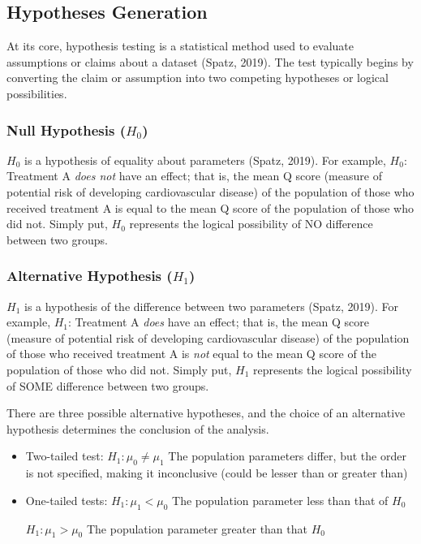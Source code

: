 \documentclass{article}
\begin{document}
 
\subsection{Hypotheses Generation}
At its core, hypothesis testing is a statistical method used to evaluate assumptions or claims about a dataset (Spatz, 2019). The test typically begins by converting the claim or assumption into two competing hypotheses or logical possibilities.  

\subsubsection{Null Hypothesis ($H_0$)}

$H_0$ is a hypothesis of equality about parameters (Spatz, 2019). For example, $H_0$: Treatment A \textit{does not} have an effect; that is, the mean Q score (measure of potential risk of developing cardiovascular disease) of the population of those who received treatment A is equal to the mean Q score of the population of those who did not. Simply put, $H_0$ represents the logical possibility of NO difference between two groups.

\subsubsection{Alternative Hypothesis ($H_1$)}
$H_1$ is a hypothesis of the difference between two parameters (Spatz, 2019). For example, $H_1$: Treatment A \textit{does} have an effect; that is, the mean Q score (measure of potential risk of developing cardiovascular disease) of the population of those who received treatment A is \textit{not} equal to the mean Q score of the population of those who did not. Simply put, $H_1$ represents the logical possibility of SOME difference between two groups.

There are three possible alternative hypotheses, and the choice of an alternative hypothesis determines the conclusion of the analysis. 

\begin{itemize}

    \item Two-tailed test: 
    \begin{math}H_1: \mu_0 \neq \mu_1\end{math} The population parameters differ, but the order is not specified, making it inconclusive (could be lesser than or greater than)
    
    \item One-tailed tests:
        \subitem \begin{math}H_1 : \mu_1 < \mu_0\end{math} The population parameter less than that of $H_0$

        \subitem \begin{math}H_1 : \mu_1 > \mu_0\end{math} The population parameter greater than that $H_0$

\end{itemize}
\end{document}
